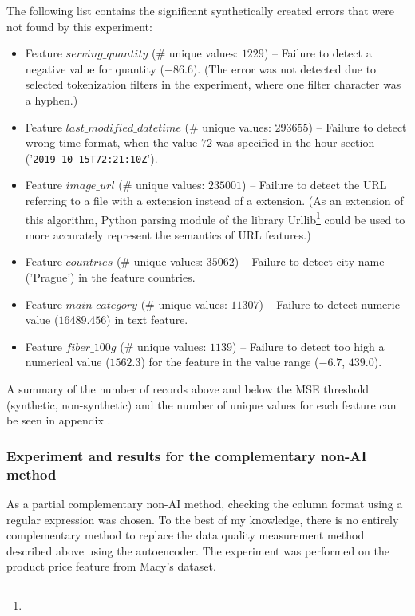 					The following list contains the significant synthetically created errors that were not found by this experiment:
					
					\begin{itemize}
						\item Feature $serving\_quantity$ (\# unique values: $1229$) -- Failure to detect a negative value for quantity ($-86.6$). (The error was not detected due to selected tokenization filters in the experiment, where one filter character was a hyphen.)
						\item Feature $last\_modified\_datetime$ (\# unique values: $293655$) -- Failure to detect wrong time format, when the value $72$ was specified in the hour section ('\texttt{2019-10-15T72:21:10Z}').
						\item Feature $image\_url$ (\# unique values: $235001$) -- Failure to detect the URL referring to a file with a  extension instead of a  extension. (As an extension of this algorithm, Python parsing module of the library Urllib\footnote{} could be used to more accurately represent the semantics of URL features.)
						\item Feature $countries$ (\# unique values: $35062$) -- Failure to detect city name ('Prague') in the feature countries.
						\item Feature $main\_category$ (\# unique values: $11307$) -- Failure to detect numeric value ($16489.456$) in text feature.
						\item Feature $fiber\_100g$ (\# unique values: $1139$) -- Failure to detect too high a numerical value ($1562.3$) for the feature in the value range ($-6.7$, $439.0$).
					\end{itemize}
					
					A summary of the number of records above and below the MSE threshold (synthetic, non-synthetic) and the number of unique values for each feature can be seen in appendix .
			         
				\subsubsection{Experiment and results for the complementary non-AI method}
				
					As a partial complementary non-AI method, checking the column format using a regular expression was chosen. To the best of my knowledge, there is no entirely complementary method to replace the data quality measurement method described above using the autoencoder. The experiment was performed on the product price feature from Macy's dataset.
					
